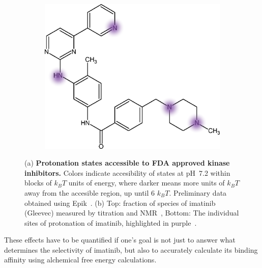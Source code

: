 \documentclass[10pt,final]{article}
\newcommand{\pH}{p$\mathrm{H}$\ }
\begin{document}
\begin{figure}[H]
\begin{subfigure}{.48\textwidth}
  \includegraphics[width=0.95\linewidth]{figures/imatinib_groups.png}
  \caption{}
  \label{figure:imatinib-pKa}
\end{subfigure}
\caption{(a) \textbf{Protonation states accessible to FDA approved kinase inhibitors.} Colors indicate accesibility of states at \pH 7.2 within blocks of $k_BT$ units of energy, where darker means more units of $k_BT$ away from the accesible region, up until 6 $k_BT$. Preliminary data obtained using Epik~\autocite{Shelley2007a,Greenwood2010a}. (b) Top: fraction of species of imatinib (Gleevec) measured by titration and NMR~\autocite{Szakacs2005a}, Bottom: The individual sites of protonation of imatinib, highlighted in purple~\autocite{Szakacs2005a}.}
\label{figure:kinase-pKa}
\end{figure}



These effects have to be quantified if one's goal is not just to answer what determines the selectivity of imatinib, but also to accurately calculate its binding affinity using alchemical free energy calculations.
\end{document}
